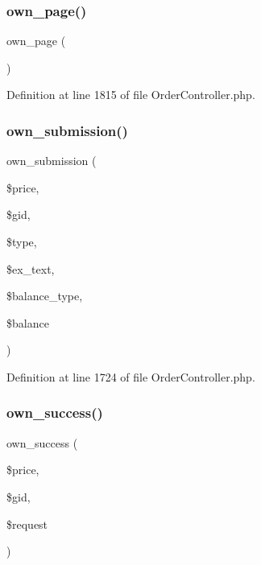 \subsubsection{\texorpdfstring{own\_page()}{own\_page()}}
{\footnotesize\ttfamily own\+\_\+page (\begin{DoxyParamCaption}{ }\end{DoxyParamCaption})}



Definition at line 1815 of file Order\+Controller.\+php.

\mbox{\label{class_responsive_1_1_http_1_1_controllers_1_1_order_controller_a6192b51d4089dcce6f25b8a866c105ef}} 
\subsubsection{\texorpdfstring{own\_submission()}{own\_submission()}}
{\footnotesize\ttfamily own\+\_\+submission (\begin{DoxyParamCaption}\item[{}]{\$price,  }\item[{}]{\$gid,  }\item[{}]{\$type,  }\item[{}]{\$ex\+\_\+text,  }\item[{}]{\$balance\+\_\+type,  }\item[{}]{\$balance }\end{DoxyParamCaption})}



Definition at line 1724 of file Order\+Controller.\+php.

\mbox{\label{class_responsive_1_1_http_1_1_controllers_1_1_order_controller_aecb3359d94e561b329b3c8c5ef54a62c}} 
\subsubsection{\texorpdfstring{own\_success()}{own\_success()}}
{\footnotesize\ttfamily own\+\_\+success (\begin{DoxyParamCaption}\item[{}]{\$price,  }\item[{}]{\$gid,  }\item[{}]{\$request }\end{DoxyParamCaption})}



